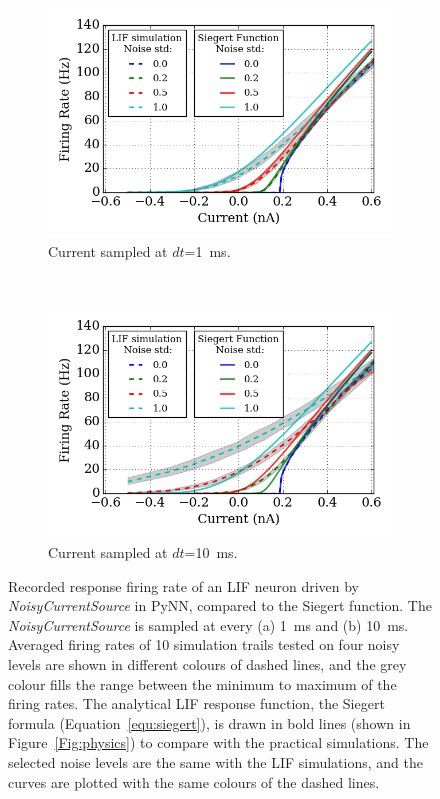 	\begin{figure}[tbp!]
		\centering
		\begin{subfigure}[t]{0.7\textwidth}
			\includegraphics[width=\textwidth]{pics_iconip/revise_2-1.png}
			\caption{Current sampled at $dt$=1~ms.}
		\end{subfigure}\\
		\begin{subfigure}[t]{0.7\textwidth}
			\includegraphics[width=\textwidth]{pics_iconip/revise_2-2.png}
			\caption{Current sampled at $dt$=10~ms.}
		\end{subfigure}
		\caption[Recorded response firing rate driven by \textit{NoisyCurrentSource}.]{Recorded response firing rate of an LIF neuron driven by \textit{NoisyCurrentSource} in PyNN, compared to the Siegert function. The \textit{NoisyCurrentSource} is sampled at every (a) 1~ms and (b) 10~ms. Averaged firing rates of 10 simulation trails tested on four noisy levels are shown in different colours of dashed lines, and the grey colour fills the range between the minimum to maximum of the firing rates. The analytical LIF response function, the Siegert formula (Equation~\ref{equ:siegert}), is drawn in bold lines (shown in Figure~\ref{Fig:physics}) to compare with the practical simulations. The selected noise levels are the same with the LIF simulations, and the curves are plotted with the same colours of the dashed lines.}
		\label{Fig:current}
	\end{figure}
	
